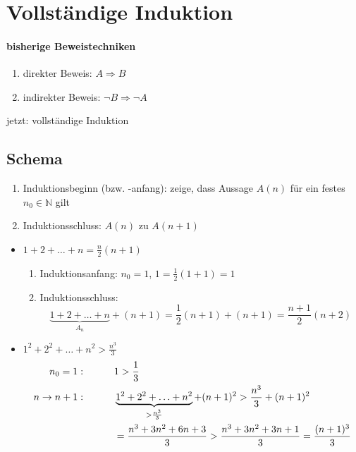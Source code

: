 \newpage
{}

\section{Vollständige Induktion}

\paragraph{bisherige Beweistechniken}

\begin{enumerate}
 \item direkter Beweis: $A \Rightarrow B$
 \item indirekter Beweis: $\neg B \Rightarrow \neg A$
\end{enumerate}

jetzt: vollständige Induktion

\subsection{Schema}

\begin{enumerate}
 \item Induktionsbeginn (bzw. -anfang): zeige, dass Aussage $A(n)$ für ein festes $n_0 \in \mathbb{N}$ gilt
 \item Induktionsschluss: $A(n)$ zu $A(n+1)$
\end{enumerate}

\begin{example}
 \begin{itemize}
  \item $1+2+\ldots+n = \frac n 2 (n+1)$
    \begin{enumerate}
    \item Induktionsanfang: $n_0 = 1$, $1 = \frac 1 2 (1+1) = 1$
    \item Induktionsschluss: \begin{equation*}\underbrace{1+2+\ldots+n}_{A_n} + (n+1) = \frac 1 2 (n+1) + (n+1) = \frac{n+1}2 (n+2)\end{equation*}
    \end{enumerate}
  \item $1^2+2^2+\ldots+n^2 > \frac{n^3}3$
    \begin{align*}
      n_0 = 1:\text{\hspace{1cm}} &1 > \frac 1 3 \text{\hspace{1cm}} \\
      n \rightarrow n + 1 :\text{\hspace{1cm}} &\underbrace{1^2+2^2+\ldots+n^2}_{>\frac{n^3}3}+(n+1)^2 > \frac{n^3}3+(n+1)^2 \\
      &= \frac{n^3+3n^2+6n+3}3 > \frac{n^3+3n^2+3n+1}3 = \frac{(n+1)^3}3
    \end{align*}
 \end{itemize}
\end{example}

